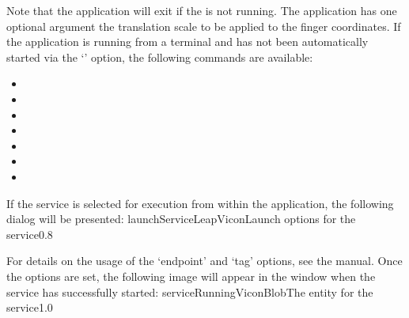 Note that the application will exit if the \emph{\RS} is not running.
The application has one optional argument \longDash{} the translation scale to be applied
to the finger coordinates.
\insertAppParameters
\insertTagDescription{\VBI}
\insertInputServiceComment
\condPage{}
If the application is running from a terminal and has not been automatically started via
the `' option, the following commands are available:
\begin{itemize}
\item{}
\item\exSp{}
\item\exSp{}
\item\exSp{}
\item\exSp{}
\item\exSp{}
\item\exSp{}
\end{itemize}
\secondaryEnd
\condPage
{}
If the service is selected for execution from within the \emph{\CMU} application, the
following dialog will be presented:
%
{launchServiceLeapVicon}{Launch options for the \emph{\VBI} service}{0.8}

For details on the usage of the `endpoint' and `tag' options, see the \emph{\CMU} manual.
Once the options are set, the following image will appear in the \emph{\CMU} window when
the service has successfully started:
%
{serviceRunningViconBlob}{The \emph{\CMU} entity for the \emph{\VBI} service}{1.0}
\secondaryEnd
\primaryEnd{}
